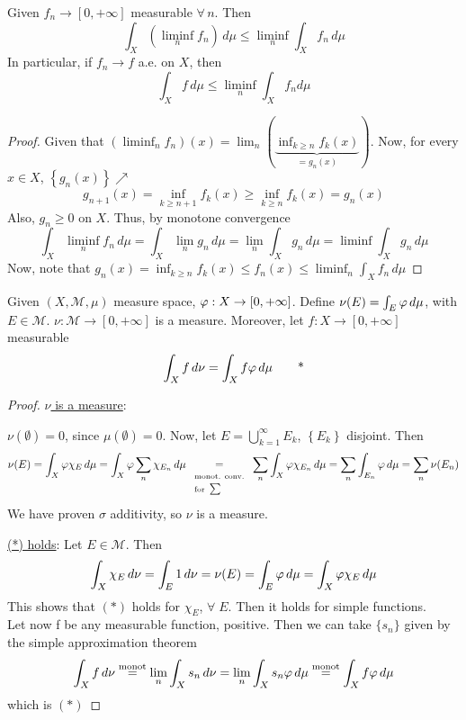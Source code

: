 \begin{lemma}
    Given \(f_n \to [0, +\infty]\) measurable \(\forall \, n\). Then 
    \[
        \int_X (\liminf_n f_n) \, d\mu \leq \liminf_n \int_X f_n \, d\mu
    \]
    In particular, if \(f_n \to f\) a.e. on \(X\), then
    \[
        \int_X f \, d\mu \leq \liminf_n \int_X f_n d\mu
    \]
\end{lemma}

\begin{proof}
    Given that \((\liminf_n f_n)(x) = \lim_n (\underbrace{\inf_{k \geq n} f_k(x)}_{= g_n (x)})\). Now, for every \(x \in X\), \(\left\{ g_n(x) \right\}\nearrow\)
    \[
        g_{n+1}(x) = \inf_{k \geq n+1} f_k(x) \geq \inf_{k \geq n} f_k(x) = g_n (x)
    \]
    Also, \(g_n \geq 0\) on \(X\). Thus, by monotone convergence
    \[
        \int_X \liminf_n f_n \, d\mu = \int_X \lim_n g_n \, d\mu = \lim_n \int_X g_n \, d\mu = \liminf \int_X g_n \, d\mu
    \]
    Now, note that \(g_n (x) = \inf_{k\geq n} f_k(x) \leq f_n(x) \leq \liminf_n \int_X f_n \, d\mu\) 
\end{proof}

\begin{theorem}
    Given \((X, \mathcal{M}, \mu)\) measure space, \(\oldphi : X \to [0, +\infty]\). Define \(\nu(E) = \int_E \oldphi \, d\mu\), with \(E \in \mathcal{M}\). 
    \(\nu : \mathcal{M} \to [0, +\infty]\) is a measure. Moreover, let \(f:X \to [0, +\infty]\) measurable
    \[
        \int_X f \, d\nu = \int_X f\oldphi \, d\mu \tag*{*}
    \]
\end{theorem}
\begin{proof}
    \noindent\underline{\(\nu\) is a measure}:  

    \(\nu(\emptyset) = 0\), since \(\mu(\emptyset) = 0\). 
    Now, let \(E = \bigcup_{k=1}^{\infty} E_k\), \(\left\{ E_k \right\}\) disjoint. Then 
    \[
        \nu(E) = \int_X \oldphi\chi_{E} \, d\mu = \int_X \oldphi\sum_n \chi_{E_n} \, d\mu \underset{\begin{array}{l} \text{\scriptsize{monot. conv.}} \\ 
            \text{\scriptsize{for }}\textstyle\sum\end{array}}{=}  \sum_n \int_X \oldphi \chi_{E_n} \, d\mu = \sum_n \int_{E_n} \oldphi \, d\mu = \sum_n \nu(E_n) 
    \]
    We have proven \(\sigma\) additivity, so \(\nu\) is a measure.

    \noindent\underline{(*) holds}:
    Let \(E \in \mathcal{M}\). Then
    \[
        \int_X \chi_E \, d\nu = \int_E 1 \, d\nu = \nu(E)  = \int_E \oldphi \, d\mu = \int_X \oldphi \chi_E \, d\mu
    \]
    This shows that \((*)\) holds for \(\chi_E\), \(\forall \; E\). Then it holds for simple functions. \\
    Let now f be any measurable function, positive. Then we can take \(\{s_n\}\) given by the simple approximation theorem
    \[
        \int_X f \, d\nu \overset{\text{monot}}{=} \lim_n \int_X s_n \, d\nu = \lim_n \int_X s_n \oldphi \, d\mu \overset{\text{monot}}{=} \int_X f \oldphi \, d\mu 
    \]
    which is \((*)\) 
\end{proof}

